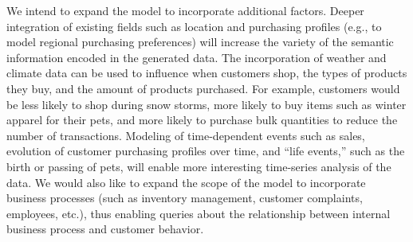 \documentclass[conference]{IEEEtran}
\begin{document}
We intend to expand the model to incorporate additional factors.  Deeper integration of existing fields such as location and purchasing profiles (e.g., to model regional purchasing preferences) will increase the variety of the semantic information encoded in the generated data. The incorporation of weather and climate data can be used to influence when customers shop, the types of products they buy, and the amount of products purchased. For example, customers would be less likely to shop during snow storms, more likely to buy items such as winter apparel for their pets, and more likely to purchase bulk quantities to reduce the number of transactions. Modeling of time-dependent events such as sales, evolution of customer purchasing profiles over time, and ``life events,'' such as the birth or passing of pets, will enable more interesting time-series analysis of the data.  We would also like to expand the scope of the model to incorporate business processes (such as inventory management, customer complaints, employees, etc.), thus enabling queries about the relationship between internal business process and customer behavior.



 


%
%
\end{document}
